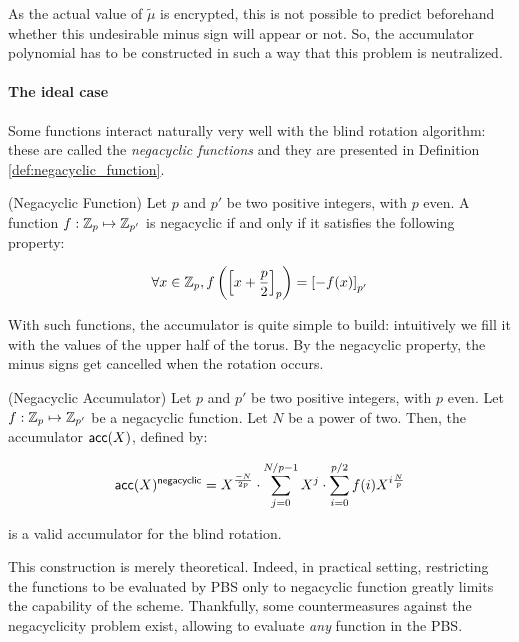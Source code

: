 As the actual value of $\tilde{\mu}$ is encrypted, this is not possible to predict beforehand whether this undesirable minus sign will appear or not. So, the accumulator polynomial has to be constructed in such a way that this problem is neutralized.


\paragraph{The ideal case}

Some functions interact naturally very well with the blind rotation algorithm: these are called the \textit{negacyclic functions} and they are presented in Definition \ref{def:negacyclic_function}.


\begin{definition} (Negacyclic Function)
	Let $p$ and $p'$ be two positive integers, with $p$ even. A function $f : \mathbb{Z}_p \mapsto \mathbb{Z}_{p'}$ is negacyclic if and only if it satisfies the following property:
	
	\[
		\forall x \in \mathbb{Z}_p, f\left (\left [ x + \frac p 2 \right ]_{p} \right ) = \left [ -f(x) \right ]_{p'}
	\]
	
	\label{def:negacyclic_function}
\end{definition}


With such functions, the accumulator is quite simple to build: intuitively we fill it with the values of the upper half of the torus. By the negacyclic property, the minus signs get cancelled when the rotation occurs.

\begin{definition} (Negacyclic Accumulator)
Let $p$ and $p'$ be two positive integers, with $p$ even. Let $f:\mathbb{Z}_p \mapsto \mathbb{Z}_{p'}$ be a negacyclic function. Let $N$ be a power of two. Then, the accumulator $\textsf{acc}(X)$, defined by:
	
	\[
		\textsf{acc}(X)^{\textsf{negacyclic}} = X^{\frac{-N}{2p}} \cdot \sum_{j=0}^{N / p - 1} X^j \cdot \sum_{i=0}^{p/2} f(i) X^{i \frac{N}{p}}
	\]
	
	is a valid accumulator for the blind rotation.
\end{definition}


This construction is merely theoretical. Indeed, in practical setting, restricting the functions to be evaluated by PBS only to negacyclic function greatly limits the capability of the scheme. Thankfully, some countermeasures against the negacyclicity problem exist, allowing to evaluate \textit{any} function in the PBS.


